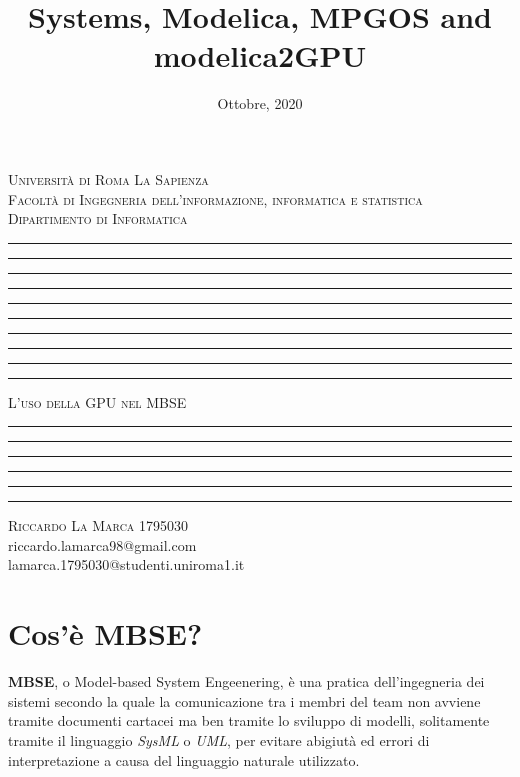\documentclass[11pt]{report}
\title{Systems, Modelica, MPGOS and modelica2GPU}
\date{Ottobre, 2020}
\makeatletter
\let\documentTitle\@title
\let\academicYear\@date
\makeatother
\begin{document}
\begin{titlepage}
    \centering
    \textsc{\Large Università di Roma La Sapienza\\[.3cm]Facoltà di Ingegneria dell'informazione, informatica e statistica\\[.3cm]Dipartimento di Informatica}
    \vspace*{1cm}
    \hrule\hrule\hrule\hrule\hrule
    \vspace*{0.1cm}
    \hrule\hrule\hrule\hrule\hrule
    \vspace*{1cm}
    \textsc{\Huge L'uso della GPU nel MBSE}
    \vspace*{1cm}
    \hrule\hrule
    \vspace*{1cm}
    \textbf{\Large \documentTitle}
    \vspace*{1cm}
    \hrule\hrule\hrule\hrule
    \vspace*{3cm}
    \textsc{\large Riccardo La Marca 1795030}\\
    \vspace*{.2cm}
    {\large riccardo.lamarca98@gmail.com}\\
    \vspace*{.2cm}
    {\large lamarca.1795030@studenti.uniroma1.it}\\
    \vspace*{8cm}
    {\normalsize \academicYear}
\end{titlepage}
\tableofcontents

\newpage
\section*{Cos'è MBSE?}
\textbf{MBSE}, o Model-based System Engeenering, è una pratica dell'ingegneria dei sistemi secondo la quale la comunicazione tra i membri del team non avviene tramite documenti cartacei ma ben tramite lo sviluppo di modelli, solitamente tramite il linguaggio \textit{SysML} o \textit{UML}, per evitare abigiutà ed errori di interpretazione a causa del linguaggio naturale utilizzato. 

\end{document}
